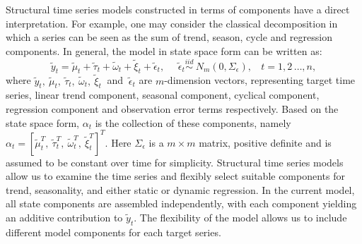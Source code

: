 \documentclass[twoside,11pt]{article}
\begin{document}
Structural time series models constructed in terms of components have a direct interpretation. For example, one may consider the classical decomposition in which a series can be seen as the sum of trend, season, cycle and regression components. 
In general, the model in state space form can be written as:
\begin{equation} \label{eq:st}
\tilde{y}_t=\tilde{\mu}_t+\tilde{\tau}_t+\tilde{\omega}_t+\tilde{\xi}_t+\tilde{\epsilon}_t,     \ \ \ \ \  \ \tilde{\epsilon}_t\stackrel{iid}\sim \  N_m(0,\Sigma_\epsilon),\ \ \ \ t=1,2\,\dots,n,
\end{equation}
where  $\tilde{y}_t,\ \tilde{\mu}_t,\ \tilde{\tau}_t,\ \tilde{\omega}_t,\ \tilde{\xi}_t \ $
and $\ \tilde{\epsilon}_t$ are $m$-dimension vectors, representing target time series, linear trend component, seasonal component, cyclical component, regression component and observation error terms respectively. Based on the  state space form, $\alpha_t$ is the collection of these components, namely  $\alpha_t=[\tilde{\mu}^T_t,\ \tilde{\tau}^T_t,\ \tilde{\omega}^T_t,\  \tilde{\xi}^T_t]^T$. Here $\Sigma_\epsilon$ is a $m\times m$ matrix, positive definite and is assumed to be constant over time for simplicity.
Structural time series models allow us to examine the time series and flexibly select suitable components for trend, seasonality, and either static or dynamic regression. In the current model, all state components are assembled independently, with each component yielding an additive contribution to $\tilde{y}_t$. The flexibility of the model allows us to include different model components
for each target series.
\end{document}
